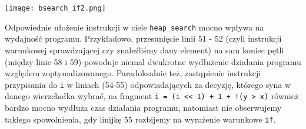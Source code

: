 \documentclass[10pt,wide]{mwart}
\begin{document}
 \texttt{[image: bsearch\_if2.png]}

Odpowiednie ułożenie instrukcji w ciele \texttt{heap\_search} mocno wpływa na wydajność programu.
Przykładowo, przesunięcie linii 51 - 52 (czyli instrukcji warunkowej sprawdzającej czy znaleźliśmy dany element) na sam koniec pętli (między linie 58 i 59) powoduje niemal dwukrotne wydłużenie działania programu względem zoptymalizowanego.
Paradoksalnie też, zastąpienie instrukcji przypisania do \texttt{i} w liniach (54-55) odpowiadających za decyzję, którego syna w danego wierzchołka wybrać, na fragment \texttt{i = (i << 1) + 1 + !(y > x)} również bardzo mocno wydłuża czas działania programu,
natomiast nie obserwujemy takiego spowolnienia, gdy linijkę 55 rozbijemy na wyrażenie warunkowe \texttt{if}.
\end{document}
